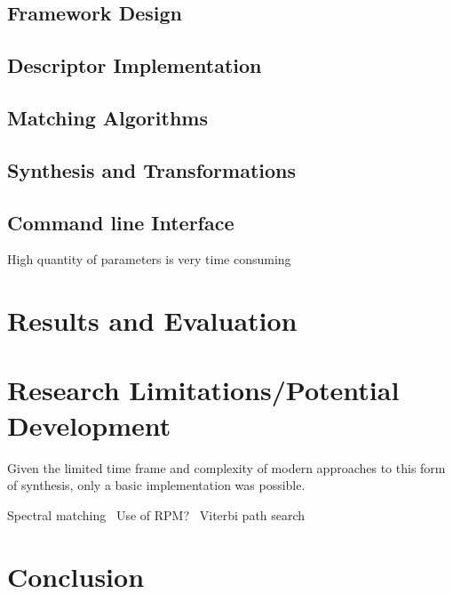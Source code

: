 \documentclass{scrartcl}
\begin{document}
    \subsection*{Framework Design}
    \subsection*{Descriptor Implementation}

    \subsection*{Matching Algorithms}
    \subsection*{Synthesis and Transformations}

    \subsection*{Command line Interface}
    High quantity of parameters is very time consuming ~\parencite{Petrushin2007} 

    \section*{Results and Evaluation}

    \section*{Research Limitations/Potential Development}
    Given the limited time frame and complexity of modern approaches to this
    form of synthesis, only a basic implementation was possible.

    Spectral matching~\parencite{Hoffman2009} 
    Use of RPM?~\parencite[p.82]{Lindemann2007}
    Viterbi path search~\parencite[p.1]{Schwarz2006a}

    \section*{Conclusion}

    \printbibliography
\end{document}
